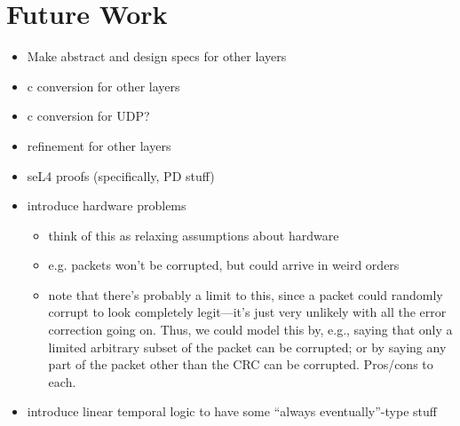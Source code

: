 \documentclass[twoside]{memoir}
\begin{document}
\chapter{Future Work}
\begin{itemize}
    \item Make abstract and design specs for other layers
    \item c conversion for other layers
    \item c conversion for UDP?
    \item refinement for other layers
    \item seL4 proofs (specifically, PD stuff)
    \item introduce hardware problems
        \begin{itemize}
            \item think of this as relaxing assumptions about hardware
            \item e.g. packets won't be corrupted, but could arrive in weird orders
            \item note that there's probably a limit to this,
                since a packet could randomly corrupt to
                look completely legit---it's just very
                unlikely with all the error correction
                going on.
                Thus, we could model this by, e.g.,
                saying that only a limited arbitrary subset
                of the packet can be corrupted;
                or by saying any part of the packet other
                than the CRC can be corrupted.
                Pros/cons to each.
        \end{itemize}
    \item introduce linear temporal logic to have some ``always eventually''-type stuff
\end{itemize}


%
%
%
%
%
\end{document}
